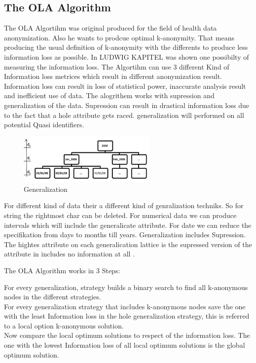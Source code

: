 \documentclass{llncs}
\begin{document}
\subsection{The OLA Algorithm }

The OLA Algortihm was original produced for the field of health data anonymization. Also he wants to prodcue optimal k-anonymity. That means producing the usual definition of k-anonymity with the differents to produce less information loss as possible. In LUDWIG KAPITEL was shown one possibilty of measuring the information loss. 
The Algortihm can use 3 different Kind of Information loss metrices which result in different anonymization result. Information loss can result in loss of statistical power, inaccurate analysis result and inefficient use of data.  
The alogrithem works with supression and generalization of the data. Supression can result in drastical information loss due to the fact that a hole attribute gets raced.  generalization will performed on all potential Quasi identifiers.
\begin{figure}[]
	\centering
	\includegraphics[width=0.6\textwidth]{general1.png}
	\caption{Generalization}%
	\label{Generalization}
\end{figure}


 For different kind of data their a different kind of genralization techniks. So for string the rightmost char can be deleted. For numerical data we can produce intervals which will include the generalicate attribute. For date we can reduce the specifikation from days to months till years. Generalization includes Supression. The hightes attribute on each generalication lattice is the supressed version of the attribute in includes no information at all \cite{el2009globally}. 

\begin{algorithm}[H]
\caption{The OLA Algorithm works in 3 Steps:}
{
 For every generalization, strategy builds a binary search to find all k-anonymous nodes in the different strategies.\\
For every generalization strategy that includes k-anonymous nodes save the one with the least Information loss in the hole generalization strategy, this is referred to a local option k-anonymous solution.\\
Now compare the local optimum solutions to respect of the information loss. The one with the lowest Information loss of all local optimum solutions is the global optimum solution.\\
}
	
\end{algorithm}
\end{document}
